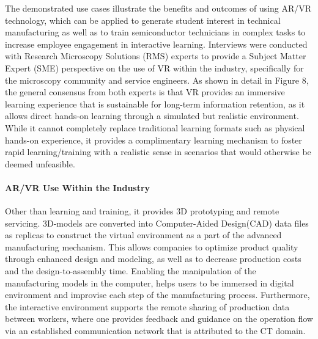 The demonstrated use cases illustrate the benefits and outcomes of using AR/VR technology, which can be applied to generate student interest in technical manufacturing as well as to train semiconductor technicians in complex tasks to increase employee engagement in interactive learning.
Interviews were conducted with Research Microscopy Solutions (RMS) experts to provide a Subject Matter Expert (SME) perspective on the use of VR within the industry, specifically for the microscopy community and service engineers. As shown in detail in Figure 8, the general consensus from both experts is that VR provides an immersive learning experience that is sustainable for long-term information retention, as it allows direct hands-on learning through a simulated but realistic environment. While it cannot completely replace traditional learning formats such as physical hands-on experience, it provides a complimentary learning mechanism to foster rapid learning/training with a realistic sense in scenarios that would otherwise be deemed unfeasible.

\paragraph {AR/VR Use Within the Industry}
Other than learning and training, it provides 3D prototyping and remote servicing. 3D-models are converted into Computer-Aided Design(CAD) data files as replicas to construct the virtual environment as a part of the advanced manufacturing mechanism. This allows companies to optimize product quality through enhanced design and modeling, as well as to decrease production costs and the design-to-assembly time\cite{Hamid2014VirtualRA}. Enabling the manipulation of the manufacturing models in the computer, helps users to be immersed in digital environment and improvise each step of the manufacturing process. Furthermore, the interactive environment supports the remote sharing of production data between workers, where one provides feedback and guidance on the operation flow via an established communication network that is attributed to the CT domain.

